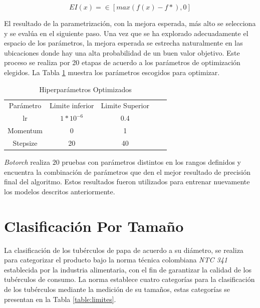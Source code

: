	\begin{equation}
		{EI(x)=\in[max(f(x)-f*),0]}
		\label{EI}
	\end{equation}
	
	El resultado de la parametrización, con la mejora esperada, más alto se selecciona y se evalúa en el siguiente paso. Una vez que se ha explorado adecuadamente el espacio de los parámetros, la mejora esperada se estrecha naturalmente en las ubicaciones donde hay una alta probabilidad de un buen valor objetivo. Este proceso se realiza por 20 etapas de acuerdo a los parámetros de optimización elegidos. La Tabla \ref{paraopt} muestra los parámetros escogidos para optimizar.
	
	\begin{table}[ht]
		\centering
		\begin{tabular}{|c|c|c|ll}
			\cline{1-3}
			Parámetro & Limite inferior              & Limite Superior &  &  \\ \cline{1-3}
			lr         & $1*10^{-6}$ & 0.4             &  &  \\ \cline{1-3}
			Momentum   & 0                            & 1               &  &  \\ \cline{1-3}
			Stepsize   & 20                           & 40              &  &  \\ \cline{1-3}
		\end{tabular}
		\caption{Hiperparámetros Optimizados}
		\label{paraopt}
	\end{table}

	\textit{Botorch} realiza $20$ pruebas con parámetros distintos en los rangos definidos y encuentra la combinación de parámetros que den el mejor resultado de precisión final del algoritmo. Estos resultados fueron utilizados para entrenar nuevamente los modelos descritos anteriormente. 


	
			
	\newpage		
	\section{Clasificación Por Tamaño}
	
	La clasificación de los tubérculos de papa de acuerdo a su diámetro, se realiza para categorizar el producto bajo la norma técnica colombiana \textit{NTC 341} establecida por la industria alimentaria, con el fin de garantizar la calidad de los tubérculos de consumo. 	La norma establece cuatro categorías para la clasificación de los tubérculos mediante la medición de su tamaños, estas categorías se presentan en la Tabla \ref{table:limites}.
		
